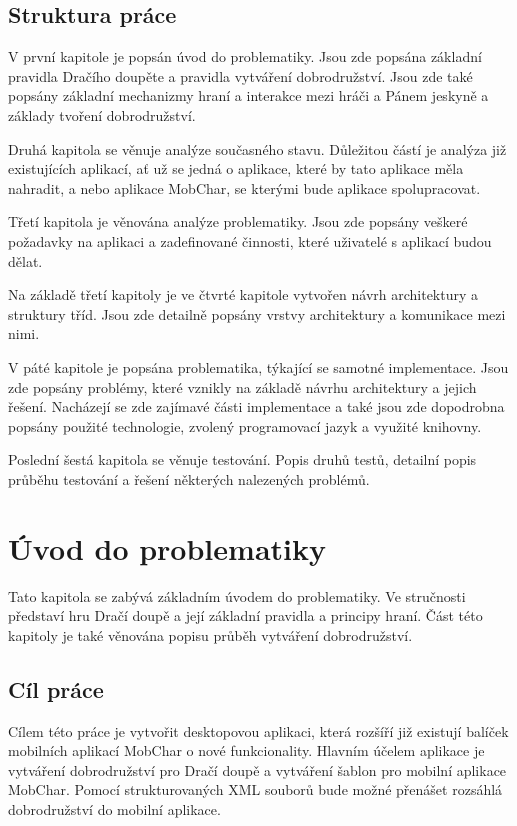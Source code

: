 \documentclass[thesis=B,czech]{resources/FITthesis}[2012/06/26]
\begin{document}
\begin{introduction}
\section*{Struktura práce}
V první kapitole je popsán úvod do problematiky. Jsou zde popsána základní pravidla Dračího doupěte a pravidla vytváření dobrodružství. Jsou zde také popsány základní mechanizmy hraní a interakce mezi hráči a Pánem jeskyně a základy tvoření dobrodružství. \par

Druhá kapitola se věnuje analýze současného stavu. Důležitou částí je analýza již existujících aplikací, ať už se jedná o aplikace, které by tato aplikace měla nahradit, a nebo aplikace MobChar, se kterými bude aplikace spolupracovat. \par

Třetí kapitola je věnována analýze problematiky. Jsou zde popsány veškeré požadavky na aplikaci a zadefinované činnosti, které uživatelé s aplikací budou dělat. \par

Na základě třetí kapitoly je ve čtvrté kapitole vytvořen návrh architektury a struktury tříd. Jsou zde detailně popsány vrstvy architektury a komunikace mezi nimi. \par

V páté kapitole je popsána problematika, týkající se samotné implementace. Jsou zde popsány problémy, které vznikly na základě návrhu architektury a jejich řešení. Nacházejí se zde zajímavé části implementace a také jsou zde dopodrobna popsány použité technologie, zvolený programovací jazyk a využité knihovny. \par

Poslední šestá kapitola se věnuje testování. Popis druhů testů, detailní popis průběhu testování a řešení některých nalezených problémů.


\end{introduction}

\chapter{Úvod do problematiky}
Tato kapitola se zabývá základním úvodem do problematiky. Ve stručnosti představí hru Dračí doupě a její základní pravidla a principy hraní. Část této kapitoly je také věnována popisu průběh vytváření dobrodružství.
	\section{Cíl práce}
Cílem této práce je vytvořit desktopovou aplikaci, která rozšíří již existují balíček mobilních aplikací MobChar o nové funkcionality. Hlavním účelem aplikace je vytváření dobrodružství pro Dračí doupě a vytváření šablon pro mobilní aplikace MobChar. Pomocí strukturovaných XML souborů bude možné přenášet rozsáhlá dobrodružství do mobilní aplikace. \par
\end{document}
